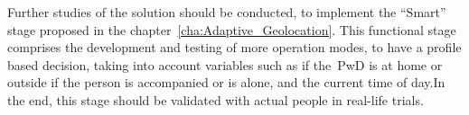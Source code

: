 Further studies of the solution should be conducted, to implement the “Smart” stage proposed in the chapter~\ref{cha:Adaptive_Geolocation}. This functional stage comprises the development and testing of more operation modes, to have a profile based decision, taking into account variables such as if the~\gls{PwD} is at home or outside if the person is accompanied or is alone, and the current time of day.\newline In the end, this stage should be validated with actual people in real-life trials.